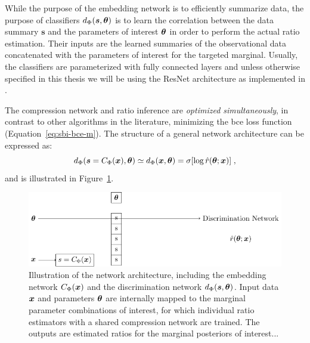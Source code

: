 While the purpose of the embedding network is to efficiently summarize data, the purpose of classifiers $d_\Phi(\boldsymbol{s}, \bm{\theta})$ is to learn the correlation between the data summary $\boldsymbol{s}$ and the parameters of interest $\bm{\theta}$ in order to perform the actual ratio estimation. Their inputs are the learned summaries of the observational data concatenated with the parameters of interest for the targeted marginal. Usually, the classifiers are parameterized with fully connected layers and unless otherwise specified in this thesis we will be using the ResNet \cite{he2016deep} architecture as implemented in \swyft \cite{Miller2022}.

The compression network and ratio inference are \emph{optimized simultaneously}, in contrast to other algorithms in the literature, minimizing the \gls*{bce} loss function (Equation~\eqref{eq:sbi-bce-m}). The structure of a general network architecture can be expressed as:
\begin{equation}\label{eq:nn-c}
    d_\Phi(\boldsymbol{s}= C_\Phi(\bm{x}), \bm{\theta}) \simeq  d_\Phi(\bm{x}, \bm{\theta})  = \sigma[ \log \hat{r}(\bm{\theta}; \bm{x})] \;,
\end{equation}
and is illustrated in Figure~\ref{fig:sbi-nn}.

\begin{figure}
    \centering
	\includegraphics[width=\linewidth]{TikZ/sbi_nn.pdf}
    \caption{ Illustration of the network architecture, including the embedding network $C_\Phi(\bm{x})$ and the discrimination network $d_\Phi(\boldsymbol{s}, \bm{\theta})$. Input data $\bm{x}$ and parameters $\bm{\theta}$ are internally mapped to the marginal parameter combinations of interest, for which individual ratio estimators with a shared compression network are trained. The outputs are estimated ratios for the marginal posteriors of interest... }
    \label{fig:sbi-nn}
\end{figure}

\medskip

